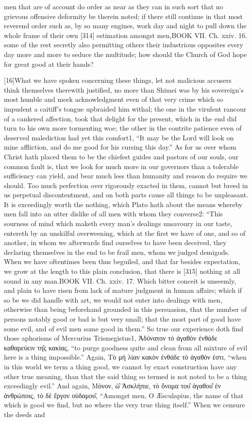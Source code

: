 men that are of account do order as near as they can in such sort that no grievous offensive deformity be therein noted; if there still continue in that most reverend order such as, by so many engines, work day and night to pull down the whole frame of their own [314] estimation amongst men,BOOK VII. Ch. xxiv. 16. some of the rest secretly also permitting others their industrious opposites every day more and more to seduce the multitude; how should the Church of God hope for great good at their hands?

[16]What we have spoken concerning these things, let not malicious accusers think themselves therewith justified, no more than Shimei was by his sovereign’s most humble and meek acknowledgment even of that very crime which so impudent a caitiff’s tongue upbraided him withal; the one in the virulent rancour of a cankered affection, took that delight for the present, which in the end did turn to his own more tormenting woe; the other in the contrite patience even of deserved malediction had yet this comfort1, “It may be the Lord will look on mine affliction, and do me good for his cursing this day.” As for us over whom Christ hath placed them to be the chiefest guides and pastors of our souls, our common fault is, that we look for much more in our governors than a tolerable sufficiency can yield, and bear much less than humanity and reason do require we should. Too much perfection over rigorously exacted in them, cannot but breed in us perpetual discontentment, and on both parts cause all things to be unpleasant. It is exceedingly worth the nothing, which Plato hath about the means whereby men fall into an utter dislike of all men with whom they converse2: “This sourness of mind which maketh every man’s dealings unsavoury in our taste, entereth by an unskilful overweening, which at the first we have of one, and so of another, in whom we afterwards find ourselves to have been deceived, they declaring themselves in the end to be frail men, whom we judged demigods. When we have oftentimes been thus beguiled, and that far besides expectation, we grow at the length to this plain conclusion, that there is [315] nothing at all sound in any man.BOOK VII. Ch. xxiv. 17. Which bitter conceit is unseemly, and plain to have risen from lack of mature judgment in human affairs; which if so be we did handle with art, we would not enter into dealings with men, otherwise than being beforehand grounded in this persuasion, that the number of persons notably good or bad is but very small; that the most part of good have some evil, and of evil men some good in them.” So true our experience doth find those aphorisms of Mercurius Trismegistus1, Ἀδύνατον τὸ ἀγαθὸν ἐνθάδε καθαρεύειν τη̑ς κακίας, “to purge goodness quite and clean from all mixture of evil here is a thing impossible.” Again, Τὸ μὴ λίαν κακὸν ἐνθάδε τὸ ἀγαθόν ἐστι, “when in this world we term a thing good, we cannot by exact construction have any other true meaning, than that the said thing so termed is not noted to be a thing exceedingly evil.” And again, Μόνον, ὡ̑ Ἀσκλήπιε, τὸ ὄνομα του̑ ἀγαθου̑ ἐν ἀνθρώποις, τὸ δὲ ἔργον οὐδαμου̑, “Amongst men, O Æsculapius, the name of that which is good we find, but no where the very true thing itself.” When we censure the deeds and 